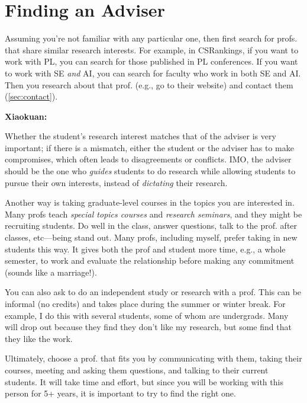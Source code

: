 \documentclass[oneside,11pt,dvipsnames]{book}
\newenvironment{commentbox}[1][]{
  \small
  \begin{mybox}
    {\small \textbf{#1}}
  }{
  \end{mybox}
}
\begin{document}
\section{Finding an Adviser}

Assuming you're not familiar with any particular one, then first search for profs. that share similar research interests.  For example, in CSRankings, if you want to work with PL, you can search for those published in PL conferences.  If you want to work with SE \emph{and} AI, you can search for faculty who work in both SE and AI.  Then you research about that prof. (e.g., go to their website) and contact them (\autoref{sec:contact}).

\begin{commentbox}[Xiaokuan:]
  Whether the student's research interest matches that of the adviser is very important;
  if there is a mismatch,
  either the student or the adviser has to make compromises,
  which often leads to disagreements or conflicts.
  IMO, the adviser should be the one who \emph{guides}  students to do research while allowing students to pursue their own interests,
  instead of \emph{dictating} their research.
\end{commentbox}


Another way is taking graduate-level courses in the topics you are interested in.  Many profs teach \emph{special topics courses} and \emph{research seminars}, and they might be recruiting students. Do well in the class, answer questions, talk to the prof. after classes, etc---being stand out.  Many profs, including myself, prefer taking in new students this way.  It gives both the prof and student more time, e.g., a whole semester, to work and evaluate the relationship before making any commitment (sounds like a marriage!).

You can also ask to do an independent study or research with a prof. This can be informal (no credits) and takes place during the summer or winter break.  For example, I do this with several students, some of whom are undergrads. Many will drop out because they find they don't like my research, but some find that they like the work.

Ultimately, choose a prof. that fits you by communicating with them, taking their courses, meeting and asking them questions, and talking to their current students. It will take time and effort, but since you will be working with this person for 5+ years, it is important to try to find the right one.
\end{document}
